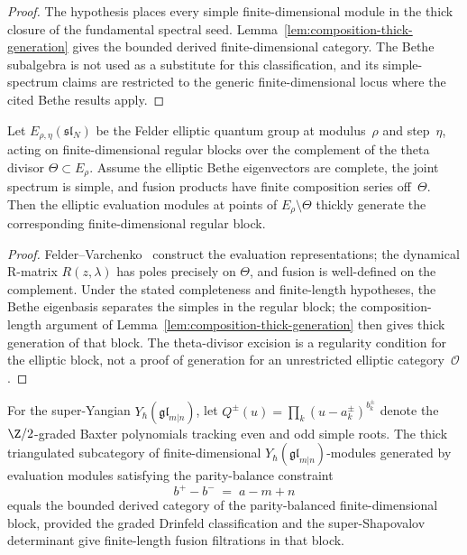 \begin{proof}
The hypothesis places every simple finite-dimensional module in the
thick closure of the fundamental spectral seed.
Lemma~\ref{lem:composition-thick-generation} gives the bounded
derived finite-dimensional category. The Bethe subalgebra is not used
as a substitute for this classification, and its simple-spectrum
claims are restricted to the generic finite-dimensional locus where
the cited Bethe results apply.
\end{proof}

\begin{proposition}
\label{prop:mc3-elliptic-theta-divisor}
Let $E_{\rho, \eta}(\mathfrak{sl}_N)$ be the Felder elliptic
quantum group at modulus~$\rho$ and step~$\eta$, acting on
finite-dimensional regular blocks over the complement of the theta
divisor $\Theta \subset E_\rho$. Assume the elliptic Bethe
eigenvectors are complete, the joint spectrum is simple, and fusion
products have finite composition series off~$\Theta$. Then the
elliptic evaluation modules at points of $E_\rho \setminus \Theta$
thickly generate the corresponding finite-dimensional regular block.
\end{proposition}

\begin{proof}
Felder--Varchenko~\cite{FelderVarchenko96} construct the
evaluation representations; the dynamical R-matrix
$R(z, \lambda)$ has poles precisely on $\Theta$, and
fusion is well-defined on the complement. Under the stated
completeness and finite-length hypotheses, the Bethe eigenbasis
separates the simples in the regular block; the composition-length
argument of Lemma~\ref{lem:composition-thick-generation} then gives
thick generation of that block. The theta-divisor excision is a
regularity condition for the elliptic block, not a proof of generation
for an unrestricted elliptic category~$\mathcal O$.
\end{proof}

\begin{proposition}
\label{prop:mc3-super-parity-balance}
For the super-Yangian $Y_\hbar(\mathfrak{gl}_{m|n})$, let
$Q^\pm(u) = \prod_{k} (u - a^\pm_k)^{b^\pm_k}$ denote the
$\Z/2$-graded Baxter polynomials tracking even and odd
simple roots. The thick triangulated subcategory of
finite-dimensional $Y_\hbar(\mathfrak{gl}_{m|n})$-modules
generated by evaluation modules satisfying the parity-balance
constraint
\[
 b^+ - b^- \;=\; a - m + n
\]
equals the bounded derived category of the parity-balanced
finite-dimensional block, provided the graded Drinfeld classification
and the super-Shapovalov determinant give finite-length fusion
filtrations in that block.
\end{proposition}

